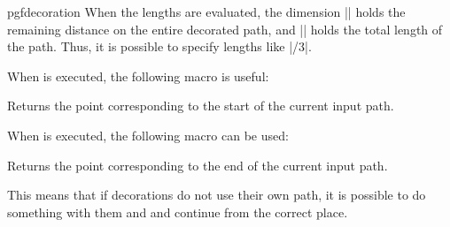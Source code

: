 \begin{environment}{{pgfdecoration}}
  When the lengths are evaluated, the dimension
  |\pgfdecoratedremainingdistance| holds the remaining distance on
  the entire decorated path, and |\pgfdecoratedpathlength| holds the
  total length of the path. Thus, it is possible to specify lengths
  like |\pgfdecoratedpathlength/3|.

\begin{codeexample}[]
\end{codeexample}

  When  is executed, the following macro is useful:
  \begin{command}{\pgfpointdecoratedpathfirst}
    Returns the point corresponding to the start of the current
    input path.
  \end{command}
  When  is executed, the following macro can be used:
  \begin{command}{\pgfpointdecoratedpathlast}
    Returns the point corresponding to the end of the current input
    path.
  \end{command}
  This means that if decorations do not use their own path, it is 
  possible to do something with them and and continue from the
  correct place. 
	
\begin{codeexample}[]
\end{codeexample}
	

\end{environment}
